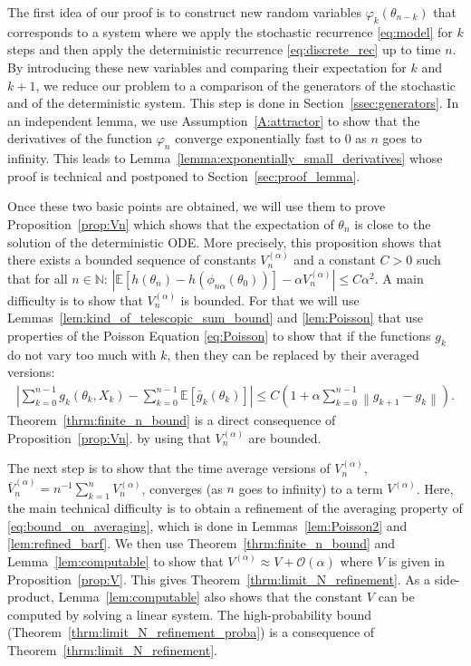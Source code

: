 \documentclass{article}
\newcommand\N{\mathbb{N}}
\newcommand\E{\mathbb{E}}
\newcommand\esp[1]{\E\left[#1\right]}
\newcommand\abs[1]{\left|#1\right|}
\newcommand\norm[1]{\left\|#1\right\|}
\newcommand\toA{^{(\alpha)}}
\newcommand\bO[1]{\mathcal{O}(#1)}
\begin{document}
The first idea of our proof is to construct new random variables $\varphi_{k}(\theta_{n-k})$ that corresponds to a system where we apply the stochastic recurrence \eqref{eq:model} for $k$ steps and then apply the deterministic recurrence \eqref{eq:discrete_rec} up to time $n$. By introducing these new variables and comparing their expectation for $k$ and $k+1$, we reduce our problem to a comparison of the generators of the stochastic and of the deterministic system. This step is done in Section~\ref{ssec:generators}.  In an independent lemma, we use Assumption~\ref{A:attractor} to show that the derivatives of the function $\varphi_{n}$ converge exponentially fast to $0$ as $n$ goes to infinity. This leads to Lemma~\ref{lemma:exponentially_small_derivatives} whose proof is technical and postponed to Section~\ref{sec:proof_lemma}.

Once these two basic points are obtained, we will use them to prove Proposition~\ref{prop:Vn} which shows that the expectation of $\theta_n$ is close to the solution of the deterministic ODE. More precisely, this proposition shows that there exists a bounded sequence of constants $V\toA_n$ and a constant $C>0$ such that for all $n\in \N$:
    $\abs{\esp{h(\theta_n) - h(\phi_{n\alpha}(\theta_0))}- \alpha V\toA_n} \le C\alpha^2$. 
A main difficulty is to show that $V\toA_n$ is bounded. For that we will use Lemmas~\ref{lem:kind_of_telescopic_sum_bound} and \ref{lem:Poisson} that use properties of the Poisson Equation \eqref{eq:Poisson} to show that if the functions $g_k$ do not vary too much with $k$, then they can be replaced by their averaged versions: 
\begin{align}
    \label{eq:bound_on_averaging}
    \abs{\sum_{k=0}^{n-1} g_k(\theta_k,X_k) - \sum_{k=0}^{n-1}\esp{\bar{g}_k(\theta_k)}} \le C(1+ \alpha\sum_{k=0}^{n-1}\norm{g_{k+1}-g_k}).
\end{align}
Theorem~\ref{thrm:finite_n_bound} is a direct consequence of Proposition~\ref{prop:Vn}.  by using that $V\toA_n$ are bounded. 

The next step is to show that the time average versions of $V\toA_n$, $\overline{V}\toA_n=n^{-1}\sum_{k=1}^nV\toA_n$, converges (as $n$ goes to infinity) to a term $V\toA$. Here, the main technical difficulty is to obtain a refinement of the averaging property of \eqref{eq:bound_on_averaging}, which is done in Lemmas~\ref{lem:Poisson2} and \ref{lem:refined_barf}. We then use Theorem~\ref{thrm:finite_n_bound} and Lemma~\ref{lem:computable} to show that $V\toA\approx V+\bO{\alpha}$ where $V$ is given in Proposition~\ref{prop:V}. This gives Theorem~\ref{thrm:limit_N_refinement}. As a side-product, Lemma~\ref{lem:computable} also shows that the constant $V$ can be computed by solving a linear system.  The high-probability bound (Theorem~\ref{thrm:limit_N_refinement_proba}) is a consequence of Theorem~\ref{thrm:limit_N_refinement}.
\end{document}
